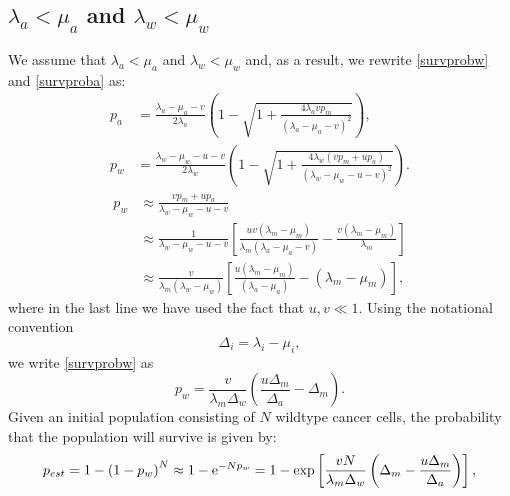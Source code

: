 \documentclass[11pt,a4paper]{article}
\newcommand{\e}{{\rm e}}
\begin{document}
\subsection{$\lambda_a<\mu_a$ and $\lambda_w<\mu_w$}
We assume that $\lambda_a<\mu_a$ and $\lambda_w<\mu_w$ and, as a result, we rewrite \eqref{survprobw} and \eqref{survproba} as:
\begin{align*}
p_a&=\frac{\lambda_a-\mu_a-v}{2\lambda_a}\left(1-\sqrt{1+\frac{4\lambda_avp_m}{\left(\lambda_a-\mu_a-v\right)^2}}\right),\\
p_w&=\frac{\lambda_w-\mu_w-u-v}{2\lambda_w}\left(1-\sqrt{1+\frac{4\lambda_w\left(vp_m+up_a\right)}{\left(\lambda_w-\mu_w-u-v\right)^2}}\right).
\end{align*}
\begin{align}\label{survprobwinitial}
p_w&\approx\frac{vp_m+up_a}{\lambda_w-\mu_w-u-v}\\
\nonumber
&\approx\frac{1}{\lambda_w-\mu_w-u-v}\left[\frac{uv\left(\lambda_m-\mu_m\right)}{\lambda_m\left(\lambda_a-\mu_a-v\right)}-\frac{v\left(\lambda_m-\mu_m\right)}{\lambda_m}\right]\\ \label{survprobw2}
&\approx\frac{v}{\lambda_m\left(\lambda_w-\mu_w\right)}\left[\frac{u\left(\lambda_m-\mu_m\right)}{\left(\lambda_a-\mu_a\right)}-\left(\lambda_m-\mu_m\right)\right],
\end{align}
where in the last line we have used the fact that $u,v\ll1$. Using the notational convention
\begin{equation}\label{notationalconv}
\Delta_i=\lambda_i-\mu_i,
\end{equation}
we write \eqref{survprobw} as
\begin{equation}\label{survprobwapprox}
p_w=\frac{v}{\lambda_m\Delta_w}\left(\frac{u\Delta_m}{\Delta_a}-\Delta_m\right).
\end{equation}
Given an initial population consisting of $N$ wildtype cancer cells, the probability that the population will survive is given by: 
\begin{align}
p_{est}=1-\left(1-p_w\right)^N\approx 1-\e^{-Np_w}=1-\exp\left[\frac{vN}{\lambda_m\Delta_w}\left(\Delta_m-\frac{u\Delta_m}{\Delta_a}\right)\right],
\end{align}
\end{document}
